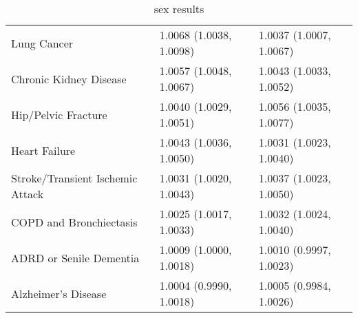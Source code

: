 \begin{table}[ht]
\begin{tabular}{lll}
  Lung Cancer & 1.0068 (1.0038, 1.0098) & 1.0037 (1.0007, 1.0067) \\ 
  Chronic Kidney Disease & 1.0057 (1.0048, 1.0067) & 1.0043 (1.0033, 1.0052) \\ 
  Hip/Pelvic Fracture & 1.0040 (1.0029, 1.0051) & 1.0056 (1.0035, 1.0077) \\ 
  Heart Failure & 1.0043 (1.0036, 1.0050) & 1.0031 (1.0023, 1.0040) \\ 
  Stroke/Transient Ischemic Attack & 1.0031 (1.0020, 1.0043) & 1.0037 (1.0023, 1.0050) \\ 
  COPD and Bronchiectasis & 1.0025 (1.0017, 1.0033) & 1.0032 (1.0024, 1.0040) \\ 
  ADRD or Senile Dementia & 1.0009 (1.0000, 1.0018) & 1.0010 (0.9997, 1.0023) \\ 
  Alzheimer's Disease & 1.0004 (0.9990, 1.0018) & 1.0005 (0.9984, 1.0026) \\ 
   \hline
\end{tabular}
\caption{sex results} 
\label{tab:stratified_OR_sex}
\end{table}
